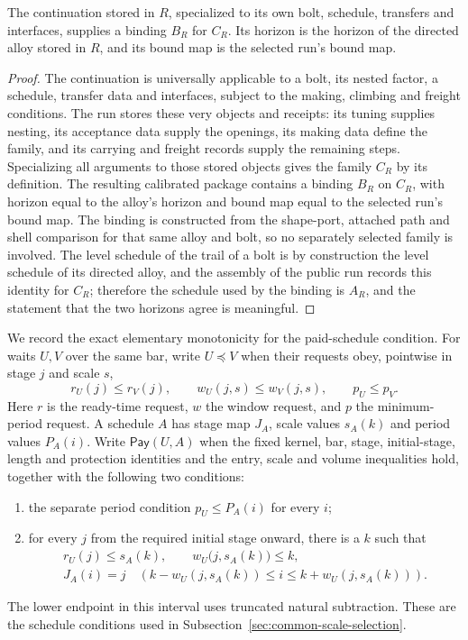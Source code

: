 \begin{proposition}
\label{prop:ex-lattice-selected-course-binding}
The continuation stored in $R$, specialized to its own bolt, schedule,
transfers and interfaces, supplies a binding $B_R$ for $C_R$.  Its horizon is
the horizon of the directed alloy stored in $R$, and its bound map is
the selected run's bound map.
\end{proposition}

\begin{proof}
The continuation is universally applicable to a bolt, its nested factor,
a schedule, transfer data and interfaces, subject to the making, climbing and
freight conditions.  The run stores these very objects and receipts: its
tuning supplies nesting, its acceptance data supply the openings, its making
data define the family, and its carrying and freight records supply the
remaining steps.  Specializing all arguments to those stored objects gives
the family $C_R$ by its definition.  The resulting calibrated package
contains a binding $B_R$ on $C_R$, with horizon equal to the alloy's
horizon and bound map equal to the selected run's bound map.  The binding
is constructed from the shape-port, attached
path and shell comparison for that same alloy and bolt, so no separately
selected family is involved.  The level schedule of the trail of a bolt
is by construction the level schedule of its directed alloy, and the
assembly of the public run records this identity for $C_R$;
therefore the schedule used by the binding is $A_R$, and the statement
that the two horizons agree is meaningful.
\end{proof}

We record the exact elementary monotonicity for the paid-schedule condition.
For waits $U,V$ over the same bar, write $U\preceq V$ when their requests
obey, pointwise in stage $j$ and scale $s$,
\[
 r_U(j)\le r_V(j),\qquad w_U(j,s)\le w_V(j,s),
 \qquad p_U\le p_V.
\]
Here $r$ is the ready-time request, $w$ the window request, and $p$ the
minimum-period request.  A schedule $A$ has stage map $J_A$, scale values
$s_A(k)$ and period values $P_A(i)$.  Write $\mathsf{Pay}(U,A)$ when the
fixed kernel, bar, stage, initial-stage, length and protection identities
and the entry, scale and volume inequalities hold, together with the
following two conditions:
\begin{enumerate}
\item the separate period condition $p_U\le P_A(i)$ for every $i$;
\item for every $j$ from the required initial stage onward, there is a $k$
      such that
      \begin{equation}\label{eq:ex-lattice-paid-plateau}
      \begin{gathered}
      r_U(j)\le s_A(k),\qquad w_U\bigl(j,s_A(k)\bigr)\le k,\\
      J_A(i)=j\quad
      (k-w_U(j,s_A(k))\le i\le k+w_U(j,s_A(k))).
      \end{gathered}
      \end{equation}
\end{enumerate}
The lower endpoint in this interval uses truncated natural subtraction.
These are the schedule conditions used in
Subsection~\ref{sec:common-scale-selection}.

